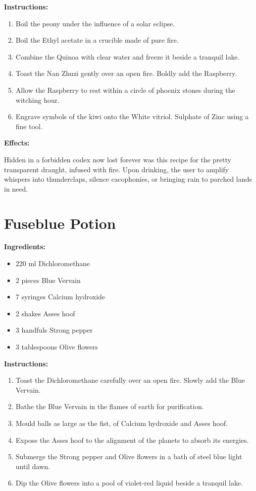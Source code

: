 \documentclass{article}
\begin{document}
\textbf{Instructions:}

\begin{enumerate}
  \item Boil the peony under the influence of a solar eclipse.
  \item Boil the Ethyl acetate in a crucible made of pure fire.
  \item Combine the Quinoa with clear water and freeze it beside a tranquil lake.
  \item Toast the Nan Zhuzi gently over an open fire. Boldly add the Raspberry.
  \item Allow the Raspberry to rest within a circle of phoenix stones during the witching hour.
  \item Engrave symbols of the kiwi onto the White vitriol. Sulphate of Zinc using a fine tool.
\end{enumerate}

\textbf{Effects:}

Hidden in a forbidden codex now lost forever was this recipe for the pretty transparent draught, infused with fire. Upon drinking, the user to amplify whispers into thunderclaps, silence cacophonies, or bringing rain to parched lands in need.

\newpage
\section*{Fuseblue Potion}

\textbf{Ingredients:}

\begin{itemize}
  \item 220 ml Dichloromethane
  \item 2 pieces Blue Vervain
  \item 7 syringes Calcium hydroxide
  \item 2 shakes Asses hoof
  \item 3 handfuls Strong pepper
  \item 3 tablespoons Olive flowers
\end{itemize}

\textbf{Instructions:}

\begin{enumerate}
  \item Toast the Dichloromethane carefully over an open fire. Slowly add the Blue Vervain.
  \item Bathe the Blue Vervain in the flames of earth for purification.
  \item Mould balls as large as the fist, of Calcium hydroxide and Asses hoof.
  \item Expose the Asses hoof to the alignment of the planets to absorb its energies.
  \item Submerge the Strong pepper and Olive flowers in a bath of steel blue light until dawn.
  \item Dip the Olive flowers into a pool of violet-red liquid beside a tranquil lake.
\end{enumerate}
\end{document}
